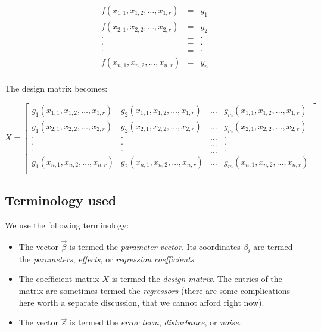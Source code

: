 \documentclass[10pt]{amsart}
\begin{document}
\begin{eqnarray*}
  f(x_{1,1},x_{1,2},\dots,x_{1,r}) & = & y_1\\
  f(x_{2,1},x_{2,2},\dots,x_{2,r}) & = & y_2\\
  \cdot & = & \cdot \\
  \cdot & = & \cdot \\
  \cdot & = & \cdot \\
  f(x_{n,1},x_{n,2},\dots,x_{n,r}) & = & y_n\\
\end{eqnarray*}

The design matrix becomes:

$$X = \left[\begin{matrix} g_1(x_{1,1},x_{1,2},\dots,x_{1,r}) & g_2(x_{1,1},x_{1,2},\dots,x_{1,r}) & \dots & g_m(x_{1,1},x_{1,2},\dots,x_{1,r}) \\ g_1(x_{2,1},x_{2,2},\dots,x_{2,r}) & g_2(x_{2,1},x_{2,2},\dots,x_{2,r}) & \dots & g_m(x_{2,1},x_{2,2},\dots,x_{2,r}) \\ \cdot & \cdot & \dots & \cdot \\  \cdot & \cdot & \dots & \cdot \\ \cdot & \cdot & \dots & \cdot \\ g_1(x_{n,1},x_{n,2},\dots,x_{n,r}) & g_2(x_{n,1},x_{n,2},\dots,x_{n,r}) & \dots & g_m(x_{n,1},x_{n,2},\dots,x_{n,r}) \\\end{matrix}\right]$$

\subsection{Terminology used}

We use the following terminology:

\begin{itemize}
\item The vector $\vec{\beta}$ is termed the {\em parameter
  vector}. Its coordinates $\beta_i$ are termed the {\em parameters},
  {\em effects}, or {\em regression coefficients}.
\item The coefficient matrix $X$ is termed the {\em design
  matrix}. The entries of the matrix are sometimes termed the {\em
  regressors} (there are some complications here worth a separate
  discussion, that we cannot afford right now).
\item The vector $\vec{\varepsilon}$ is termed the {\em error term},
  {\em disturbance}, or {\em noise}.
\end{itemize}
\end{document}
